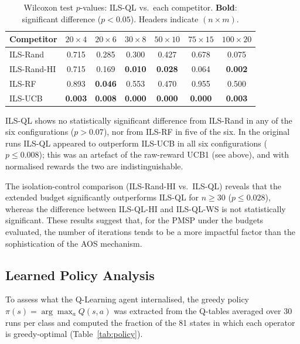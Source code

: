 \documentclass[final,3p,times,11pt,authoryear]{elsarticle}
\begin{document}
\begin{table}[ht]
\centering
\caption{Wilcoxon test $p$-values: ILS-QL vs.\ each competitor.
         \textbf{Bold}: significant difference ($p < 0.05$).
         Headers indicate $(n \times m)$.}
\label{tab:wilcoxon}
\renewcommand{\arraystretch}{1.15}
{\footnotesize
\setlength{\tabcolsep}{4pt}
\begin{tabular}{@{}lcccccc@{}}
\toprule
Competitor
  & $20{\times}4$  & $20{\times}6$  & $30{\times}8$
  & $50{\times}10$ & $75{\times}15$ & $100{\times}20$ \\
\midrule
ILS-Rand
  & 0.715 & 0.285 & 0.300 & 0.427 & 0.678 & 0.075 \\
ILS-Rand-HI
  & 0.715 & 0.169 & \textbf{0.010}
  & \textbf{0.028} & 0.064 & \textbf{0.002} \\
ILS-RF
  & 0.893 & \textbf{0.046} & 0.553 & 0.470 & 0.955 & 0.500 \\
ILS-UCB
  & \textbf{0.003} & \textbf{0.008} & \textbf{0.000}
  & \textbf{0.000} & \textbf{0.000} & \textbf{0.003} \\
\bottomrule
\end{tabular}}
\end{table}

ILS-QL shows no statistically significant difference from ILS-Rand in
any of the six configurations ($p > 0.07$), nor from ILS-RF in
five of the six. In the original runs ILS-QL appeared to outperform
ILS-UCB in all six configurations ($p \leq 0.008$); this was an artefact
of the raw-reward UCB1 (see above), and with normalised rewards the two
are indistinguishable.

The isolation-control comparison (ILS-Rand-HI vs.\ ILS-QL) reveals
that the extended budget significantly outperforms ILS-QL for
$n \geq 30$ ($p \leq 0.028$), whereas the difference between ILS-QL-HI
and ILS-QL-WS is not statistically significant. These results suggest
that, for the PMSP under the budgets evaluated, the number of
iterations tends to be a more impactful factor than the sophistication
of the AOS mechanism.

\subsection{Learned Policy Analysis}
\label{sec:policy}

To assess what the Q-Learning agent internalised, the greedy policy
$\pi(s) = \arg\max_a Q(s,a)$ was extracted from the Q-tables averaged
over 30 runs per class and computed the fraction of the 81 states in
which each operator is greedy-optimal (Table~\ref{tab:policy}).
\end{document}
